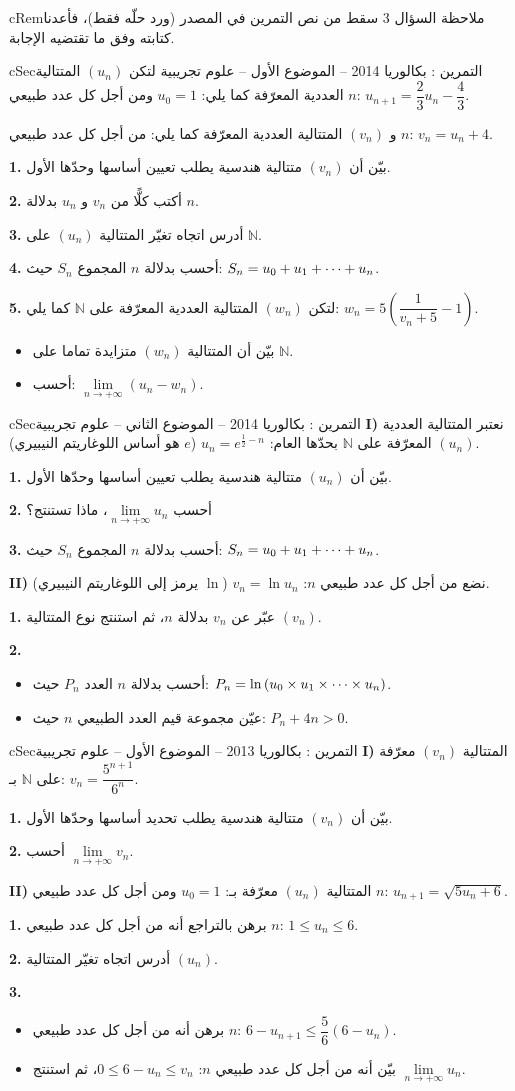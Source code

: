 \documentclass[12pt,a4paper]{article}
\newenvironment{BOX}[2]{\begin{otherlanguage}{english}\begin{arbox}{#1}{#2}}{\end{arbox}\end{otherlanguage}}
\newenvironment{molahada}[1][ملاحظة]{\begin{BOX}{cRem}{#1}}{\end{BOX}}
\newcounter{exo}
\newenvironment{tamrin}[1]{\stepcounter{exo}\begin{BOX}{cSec}{التمرين \theexo: #1}}{\end{BOX}}
\renewcommand{\cdots}{\mathinner{\cdotp\cdotp\cdotp}}
\newcommand{\N}{\mathbb{N}}
\newenvironment{sq}{\begin{itemize}[leftmargin=2.4em,itemsep=3pt]}{\end{itemize}}
\newcommand{\qa}{\item[(أ)]}\newcommand{\qb}{\item[(ب)]}\newcommand{\qc}{\item[(جـ)]}\newcommand{\qd}{\item[(د)]}\newcommand{\qe}{\item[(هـ)]}
\newcommand{\QQ}[1]{\par\smallskip\textbf{#1.} }
\begin{document}
\begin{molahada}
السؤال 3 سقط من نص التمرين في المصدر (ورد حلّه فقط)، فأعدنا كتابته وفق ما تقتضيه الإجابة.
\end{molahada}

\begin{tamrin}{بكالوريا 2014 -- الموضوع الأول -- علوم تجريبية}
لتكن $(u_n)$ المتتالية العددية المعرّفة كما يلي: $u_0=1$ ومن أجل كل عدد طبيعي $n$: $u_{n+1}=\dfrac{2}{3}u_n-\dfrac{4}{3}$.

و $(v_n)$ المتتالية العددية المعرّفة كما يلي: من أجل كل عدد طبيعي $n$: $v_n=u_n+4$.
\QQ{1} بيّن أن $(v_n)$ متتالية هندسية يطلب تعيين أساسها وحدّها الأول.
\QQ{2} أكتب كلًّا من $v_n$ و $u_n$ بدلالة $n$.
\QQ{3} أدرس اتجاه تغيّر المتتالية $(u_n)$ على $\N$.
\QQ{4} أحسب بدلالة $n$ المجموع $S_n$ حيث: $S_n=u_0+u_1+\cdots+u_n$.
\QQ{5} لتكن $(w_n)$ المتتالية العددية المعرّفة على $\N$ كما يلي: $w_n=5\left(\dfrac{1}{v_n+5}-1\right)$.
\begin{sq}
\qa بيّن أن المتتالية $(w_n)$ متزايدة تماما على $\N$.
\qb أحسب: $\lim\limits_{n\to+\infty}(u_n-w_n)$.
\end{sq}
\end{tamrin}

\begin{tamrin}{بكالوريا 2014 -- الموضوع الثاني -- علوم تجريبية}
\textbf{I)} نعتبر المتتالية العددية $(u_n)$ المعرّفة على $\N$ بحدّها العام: $u_n=e^{\frac{1}{2}-n}$ ($e$ هو أساس اللوغاريتم النيبيري).
\QQ{1} بيّن أن $(u_n)$ متتالية هندسية يطلب تعيين أساسها وحدّها الأول.
\QQ{2} أحسب $\lim\limits_{n\to+\infty}u_n$، ماذا تستنتج؟
\QQ{3} أحسب بدلالة $n$ المجموع $S_n$ حيث: $S_n=u_0+u_1+\cdots+u_n$.

\textbf{II)} نضع من أجل كل عدد طبيعي $n$: $v_n=\ln u_n$ ($\ln$ يرمز إلى اللوغاريتم النيبيري).
\QQ{1} عبّر عن $v_n$ بدلالة $n$، ثم استنتج نوع المتتالية $(v_n)$.
\QQ{2}
\begin{sq}
\qa أحسب بدلالة $n$ العدد $P_n$ حيث: $P_n=\ln\left(u_0\times u_1\times\cdots\times u_n\right)$.
\qb عيّن مجموعة قيم العدد الطبيعي $n$ حيث: $P_n+4n>0$.
\end{sq}
\end{tamrin}

\begin{tamrin}{بكالوريا 2013 -- الموضوع الأول -- علوم تجريبية}
\textbf{I)} المتتالية $(v_n)$ معرّفة على $\N$ بـ: $v_n=\dfrac{5^{n+1}}{6^n}$.
\QQ{1} بيّن أن $(v_n)$ متتالية هندسية يطلب تحديد أساسها وحدّها الأول.
\QQ{2} أحسب $\lim\limits_{n\to+\infty}v_n$.

\textbf{II)} المتتالية $(u_n)$ معرّفة بـ: $u_0=1$ ومن أجل كل عدد طبيعي $n$: $u_{n+1}=\sqrt{5u_n+6}$.
\QQ{1} برهن بالتراجع أنه من أجل كل عدد طبيعي $n$: $1\le u_n\le 6$.
\QQ{2} أدرس اتجاه تغيّر المتتالية $(u_n)$.
\QQ{3}
\begin{sq}
\qa برهن أنه من أجل كل عدد طبيعي $n$: $6-u_{n+1}\le\dfrac{5}{6}\left(6-u_n\right)$.
\qb بيّن أنه من أجل كل عدد طبيعي $n$: $0\le 6-u_n\le v_n$، ثم استنتج $\lim\limits_{n\to+\infty}u_n$.
\end{sq}
\end{tamrin}
\end{document}
